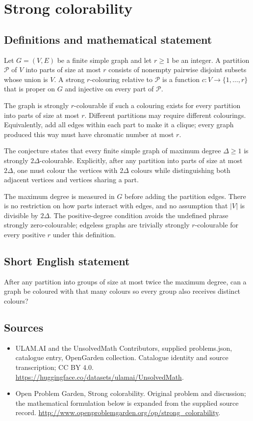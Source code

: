 \documentclass[11pt,a4paper]{article}
\begin{document}
\section*{Strong colorability}\label{statement}

\subsection{Definitions and mathematical statement}
Let $G=(V,E)$ be a finite
simple graph and let $r\geq1$
be an integer. A partition
$\mathcal P$ of $V$ into
parts of size at most $r$
consists of nonempty pairwise
disjoint subsets whose union
is $V$. A strong $r$-colouring
relative to $\mathcal P$ is
a function $c:V\to\{1,\ldots,r\}$
that is proper on $G$ and
injective on every part of
$\mathcal P$.

The graph is strongly
$r$-colourable if such a
colouring exists for every
partition into parts of size
at most $r$. Different
partitions may require different
colourings. Equivalently, add
all edges within each part
to make it a clique; every
graph produced this way must
have chromatic number at
most $r$.

The conjecture states that
every finite simple graph
of maximum degree $\Delta\geq1$
is strongly $2\Delta$-colourable.
Explicitly, after any partition
into parts of size at most
$2\Delta$, one must colour
the vertices with $2\Delta$
colours while distinguishing
both adjacent vertices and
vertices sharing a part.

The maximum degree is measured
in $G$ before adding the
partition edges. There is
no restriction on how parts
interact with edges, and no
assumption that $|V|$ is
divisible by $2\Delta$.
The positive-degree condition
avoids the undefined phrase
strongly zero-colourable; edgeless
graphs are trivially strongly
$r$-colourable for every
positive $r$ under this
definition.
\subsection{Short English statement}
After any partition into groups of size at most twice the maximum degree, can a graph be coloured with that many colours so every group also receives distinct colours?
\subsection{Sources}
\begin{itemize}
\item[S1] ULAM.AI and the UnsolvedMath Contributors, supplied problems.json, catalogue entry, OpenGarden collection. Catalogue identity and source transcription; CC BY 4.0.
\url{https://huggingface.co/datasets/ulamai/UnsolvedMath}.
\item[S2] Open Problem Garden, Strong colorability. Original problem and discussion; the mathematical formulation below is expanded from the supplied source record.
\url{http://www.openproblemgarden.org/op/strong_colorability}.
\end{itemize}
\end{document}
